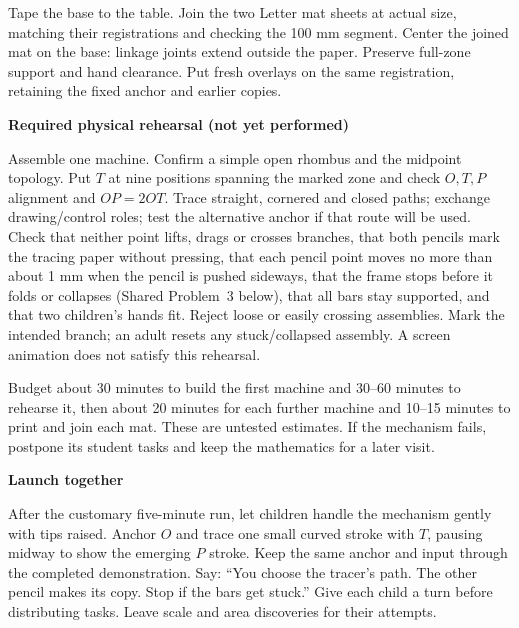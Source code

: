 \documentclass[11pt,letterpaper]{article}
\newcommand{\sub}[1]{\par\textbf{#1}\par}
\begin{document}
Tape the base to the table. Join the two Letter mat sheets at actual size, matching their registrations and checking the 100 mm segment. Center the joined mat on the base: linkage joints extend outside the paper. Preserve full-zone support and hand clearance. Put fresh overlays on the same registration, retaining the fixed anchor and earlier copies.

\sub{Required physical rehearsal (not yet performed)}
Assemble one machine. Confirm a simple open rhombus and the midpoint topology. Put $T$ at nine positions spanning the marked zone and check $O,T,P$ alignment and $OP=2OT$. Trace straight, cornered and closed paths; exchange drawing/control roles; test the alternative anchor if that route will be used. Check that neither point lifts, drags or crosses branches, that both pencils mark the tracing paper without pressing, that each pencil point moves no more than about 1 mm when the pencil is pushed sideways, that the frame stops before it folds or collapses (Shared Problem~3 below), that all bars stay supported, and that two children's hands fit. Reject loose or easily crossing assemblies. Mark the intended branch; an adult resets any stuck/collapsed assembly. A screen animation does not satisfy this rehearsal.

Budget about 30 minutes to build the first machine and 30--60 minutes to rehearse it, then about 20 minutes for each further machine and 10--15 minutes to print and join each mat. These are untested estimates. If the mechanism fails, postpone its student tasks and keep the mathematics for a later visit.

\newpage
\sub{Launch together}
After the customary five-minute run, let children handle the mechanism gently with tips raised. Anchor $O$ and trace one small curved stroke with $T$, pausing midway to show the emerging $P$ stroke. Keep the same anchor and input through the completed demonstration. Say: ``You choose the tracer's path. The other pencil makes its copy. Stop if the bars get stuck.'' Give each child a turn before distributing tasks. Leave scale and area discoveries for their attempts.
\end{document}
